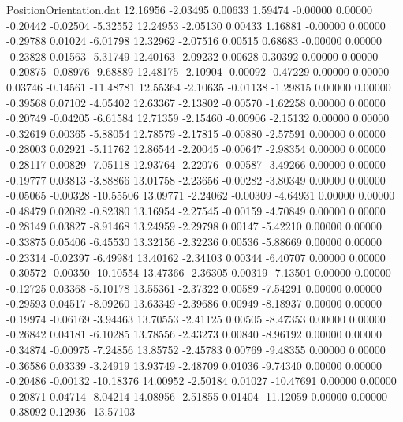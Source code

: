 \begin{filecontents}{PositionOrientation.dat}
  12.16956   -2.03495    0.00633     1.59474   -0.00000    0.00000   -0.20442   -0.02504   -5.32552
  12.24953   -2.05130    0.00433     1.16881   -0.00000    0.00000   -0.29788    0.01024   -6.01798
  12.32962   -2.07516    0.00515     0.68683   -0.00000    0.00000   -0.23828    0.01563   -5.31749
  12.40163   -2.09232    0.00628     0.30392    0.00000    0.00000   -0.20875   -0.08976   -9.68889
  12.48175   -2.10904   -0.00092    -0.47229    0.00000    0.00000    0.03746   -0.14561  -11.48781
  12.55364   -2.10635   -0.01138    -1.29815    0.00000    0.00000   -0.39568    0.07102   -4.05402
  12.63367   -2.13802   -0.00570    -1.62258    0.00000    0.00000   -0.20749   -0.04205   -6.61584
  12.71359   -2.15460   -0.00906    -2.15132    0.00000    0.00000   -0.32619    0.00365   -5.88054
  12.78579   -2.17815   -0.00880    -2.57591    0.00000    0.00000   -0.28003    0.02921   -5.11762
  12.86544   -2.20045   -0.00647    -2.98354    0.00000    0.00000   -0.28117    0.00829   -7.05118
  12.93764   -2.22076   -0.00587    -3.49266    0.00000    0.00000   -0.19777    0.03813   -3.88866
  13.01758   -2.23656   -0.00282    -3.80349    0.00000    0.00000   -0.05065   -0.00328  -10.55506
  13.09771   -2.24062   -0.00309    -4.64931    0.00000    0.00000   -0.48479    0.02082   -0.82380
  13.16954   -2.27545   -0.00159    -4.70849    0.00000    0.00000   -0.28149    0.03827   -8.91468
  13.24959   -2.29798    0.00147    -5.42210    0.00000    0.00000   -0.33875    0.05406   -6.45530
  13.32156   -2.32236    0.00536    -5.88669    0.00000    0.00000   -0.23314   -0.02397   -6.49984
  13.40162   -2.34103    0.00344    -6.40707    0.00000    0.00000   -0.30572   -0.00350  -10.10554
  13.47366   -2.36305    0.00319    -7.13501    0.00000    0.00000   -0.12725    0.03368   -5.10178
  13.55361   -2.37322    0.00589    -7.54291    0.00000    0.00000   -0.29593    0.04517   -8.09260
  13.63349   -2.39686    0.00949    -8.18937    0.00000    0.00000   -0.19974   -0.06169   -3.94463
  13.70553   -2.41125    0.00505    -8.47353    0.00000    0.00000   -0.26842    0.04181   -6.10285
  13.78556   -2.43273    0.00840    -8.96192    0.00000    0.00000   -0.34874   -0.00975   -7.24856
  13.85752   -2.45783    0.00769    -9.48355    0.00000    0.00000   -0.36586    0.03339   -3.24919
  13.93749   -2.48709    0.01036    -9.74340    0.00000    0.00000   -0.20486   -0.00132  -10.18376
  14.00952   -2.50184    0.01027   -10.47691    0.00000    0.00000   -0.20871    0.04714   -8.04214
  14.08956   -2.51855    0.01404   -11.12059    0.00000    0.00000   -0.38092    0.12936  -13.57103

\end{filecontents}
